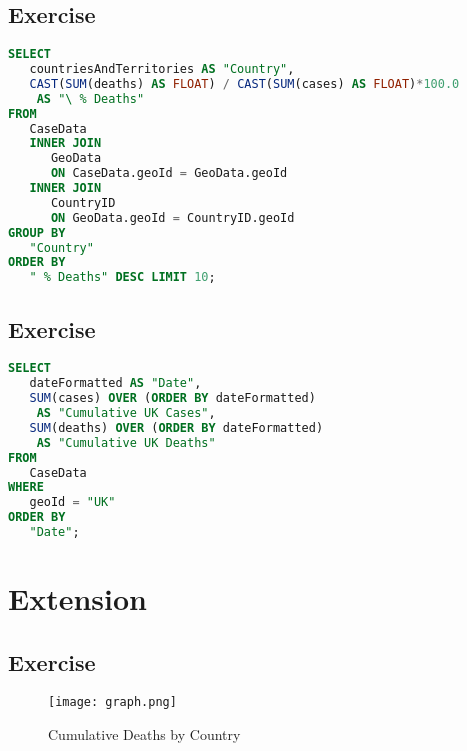 \documentclass{article}
\newcounter{ex}
\newcommand{\exercise}{
\stepcounter{ex}
\subsection{Exercise \arabic{ex}}
}
\begin{document}
\exercise
\begin{lstlisting}[language=SQL]
SELECT
   countriesAndTerritories AS "Country",
   CAST(SUM(deaths) AS FLOAT) / CAST(SUM(cases) AS FLOAT)*100.0 
    AS "\ % Deaths" 
FROM
   CaseData 
   INNER JOIN
      GeoData 
      ON CaseData.geoId = GeoData.geoId 
   INNER JOIN
      CountryID 
      ON GeoData.geoId = CountryID.geoId 
GROUP BY
   "Country" 
ORDER BY
   " % Deaths" DESC LIMIT 10;
\end{lstlisting}
\vspace{15pt}

\exercise
\begin{lstlisting}[language=SQL]
SELECT
   dateFormatted AS "Date",
   SUM(cases) OVER (ORDER BY dateFormatted) 
    AS "Cumulative UK Cases",
   SUM(deaths) OVER (ORDER BY dateFormatted) 
    AS "Cumulative UK Deaths" 
FROM
   CaseData 
WHERE
   geoId = "UK" 
ORDER BY
   "Date";
\end{lstlisting}
\newpage
\section{Extension}
\lstset{style=bash}
\exercise

\begin{figure}[!htb]
    \centering
    \texttt{[image: graph.png]}
    \caption{Cumulative Deaths by Country}
    \label{fig:Graph}
\end{figure}
\end{document}
